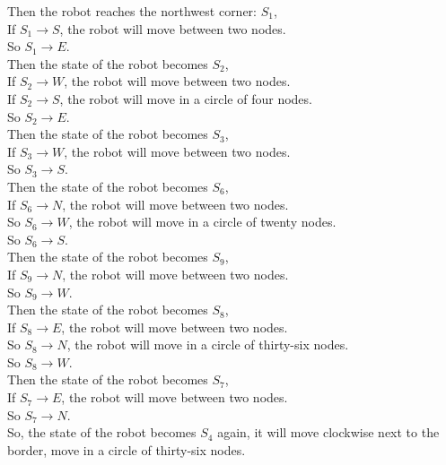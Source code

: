 \documentclass[paper=a4, fontsize=11pt]{scrartcl} %
\numberwithin{equation}{section} %
\numberwithin{figure}{section} %
\numberwithin{table}{section} %
\begin{document}
Then the robot reaches the northwest corner: $S_1$, \\
If $S_1 \rightarrow S$, the robot will move between two nodes. \\
So $S_1 \rightarrow E$.\\

Then the state of the robot becomes $S_2$, \\
If $S_2 \rightarrow W$, the robot will move between two nodes. \\
If $S_2 \rightarrow S$, the robot will move in a circle of four nodes. \\
So $S_2 \rightarrow E$.\\

Then the state of the robot becomes $S_3$, \\
If $S_3 \rightarrow W$, the robot will move between two nodes. \\
So $S_3 \rightarrow S$.\\

Then the state of the robot becomes $S_6$, \\
If $S_6 \rightarrow N$, the robot will move between two nodes. \\
So $S_6 \rightarrow W$, the robot will move in a circle of twenty nodes. \\
So $S_6 \rightarrow S$.\\

Then the state of the robot becomes $S_9$, \\
If $S_9 \rightarrow N$, the robot will move between two nodes. \\
So $S_9 \rightarrow W$.\\

Then the state of the robot becomes $S_8$, \\
If $S_8 \rightarrow E$, the robot will move between two nodes. \\
So $S_8 \rightarrow N$, the robot will move in a circle of thirty-six nodes. \\
So $S_8 \rightarrow W$.\\

Then the state of the robot becomes $S_7$, \\
If $S_7 \rightarrow E$, the robot will move between two nodes. \\
So $S_7 \rightarrow N$.\\

So, the state of the robot becomes $S_4$ again, it will move clockwise next to the border, 
move in a circle of thirty-six nodes.\\
\end{document}
